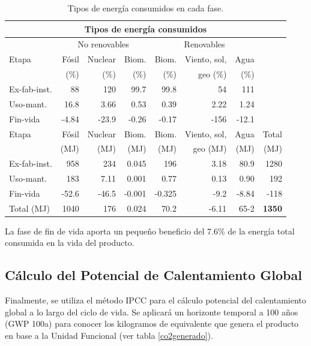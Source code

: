 \begin{table}[!htb]
\centering
\begin{tabular}{p{2cm}rrrrrrr}
\toprule
\multicolumn{8}{c}{Tipos de energía consumidos}\\
\midrule
 & \multicolumn{3}{c}{No renovables} & \multicolumn{3}{c}{Renovables}\\
\midrule
Etapa & Fósil & Nuclear & Biom. & Biom. & Viento, sol,& Agua\\
 & (\%) & (\%) & (\%) & (\%) & geo (\%) & (\%)\\
\midrule
Ex-fab-inst. & 88 & 120 & 99.7 & 99.8 & 54 & 111\\
Uso-mant. & 16.8 & 3.66 & 0.53 & 0.39 & 2.22 & 1.24\\
Fin-vida & -4.84 & -23.9 & -0.26 & -0.17 & -156 & -12.1\\
\midrule
\midrule
Etapa & Fósil & Nuclear & Biom. & Biom. & Viento, sol,& Agua & Total\\
& (\si{MJ}) & (\si{MJ}) & (\si{MJ}) & (\si{MJ}) & geo (\si{MJ}) & (\si{MJ}) & (\si{MJ})\\
\midrule
Ex-fab-inst. & 958 & 234 & 0.045 & 196 & 3.18 & 80.9 & 1280\\
Uso-mant. & 183 & 7.11 & 0.001 & 0.77 & 0.13 & 0.90 & 192\\
Fin-vida & -52.6 & -46.5 & -0.001 & -0.325 & -9.2 & -8.84 & -118\\
\midrule
Total (\si{MJ}) & 1040 & 176 & 0.024 & 70.2 & -6.11 & 65-2 & \textbf{1350}\\
\bottomrule
\end{tabular}
\caption{Tipos de energía consumidos en cada fase.}
\label{tiposenergiaced}
\end{table}

La fase de fin de vida aporta un pequeño beneficio del 7.6\% de la energía total consumida en la vida del producto.

\subsection{Cálculo del Potencial de Calentamiento Global}
Finalmente, se utiliza el método IPCC para el cálculo potencial del calentamiento global a lo largo del ciclo de vida. Se aplicará un horizonte temporal a 100 años (GWP 100a) para conocer los kilogramos de  equivalente que genera el producto en base a la Unidad Funcional (ver tabla \ref{co2generado}).

